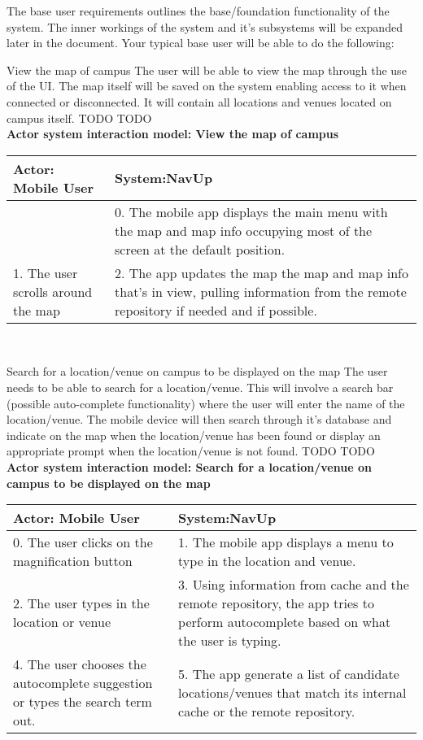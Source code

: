 The base user requirements outlines the base/foundation functionality of the system. The inner workings of the system and it's subsystems will be expanded later in the document. Your typical base user will be able to do the following:
\\
\bigskip

\FuncReq
{View the map of campus}
{The user will be able to view the map through the use of the UI. The map itself will be saved on the system enabling access to it when connected or disconnected. It will contain all locations and venues located on campus itself.}
{TODO}
{TODO}
    \\
    \textbf{Actor system interaction model: View the map of campus }\\
    \begin{tabular}{ | p{6cm} | p{6cm} |}
    \hline
    Actor: Mobile User & System:NavUp \\ \hline
     & 0. The mobile app displays the main menu with the map and map info occupying most of the screen at the default position.\\ \hline
    1. The user scrolls around the map & 2. The app updates the map the map and map info that's in view, pulling information from the remote repository if needed and if possible.\\ \hline
    
    \end{tabular}
\\
\bigskip

\FuncReq
{Search for a location/venue on campus to be displayed on the map}
{The user needs to be able to search for a location/venue. This will involve a search bar (possible auto-complete functionality) where the user will enter the name of the location/venue. The mobile device will then search through it's database and indicate on the map when the location/venue has been found or display an appropriate prompt when the location/venue is not found.}
{TODO}
{TODO}
    \\
    \textbf{Actor system interaction model: Search for a location/venue on campus to be displayed on the map }\\
    \begin{tabular}{ | p{6cm} | p{6cm} |}
    \hline
    Actor: Mobile User & System:NavUp \\ \hline
    0. The user clicks on the magnification button & 1. The mobile app displays a menu to type in the location and venue.\\ \hline
    2. The user types in the location or venue & 3. Using information from cache and the remote repository, the app tries to perform autocomplete based on what the user is typing.\\ \hline
    4. The user chooses the autocomplete suggestion or types the search term out. & 5. The app generate a list of candidate locations/venues that match its internal cache or the remote repository.\\ \hline
    \end{tabular}
\\
\bigskip


